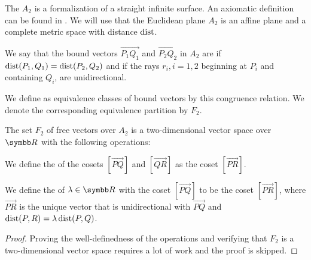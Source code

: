 \begin{definition}\label{def:euclidean_plane}
  The  \( A_2 \) is a formalization of a straight infinite surface. An axiomatic definition can be found in \cite{nLab:euclidean_geometry}. We will use that the Euclidean plane \( A_2 \) is an affine plane and a complete metric space with distance \( \operatorname{dist} \).
\end{definition}

\begin{definition}\label{def:euclidean_plane_free_vector}
  We say that the bound vectors \( \Vec{P_1 Q_1} \) and \( \Vec{P_2 Q_2} \) in \( A_2 \) are  if \( \operatorname{dist}(P_1, Q_1) = \operatorname{dist}(P_2, Q_2) \) and if the rays \( r_i, i = 1, 2 \) beginning at \( P_i \) and containing \( Q_i \), are unidirectional.

  We define  as equivalence classes of bound vectors by this congruence relation. We denote the corresponding equivalence partition by \( F_2 \).
\end{definition}

\begin{theorem}\label{thm:euclidean_plane_factorization}
  The set \( F_2 \) of free vectors over \( A_2 \) is a two-dimensional vector space over \( \R \) with the following operations:
  \begin{thmenum}
     We define the  of the cosets \( [\Vec{PQ}] \) and \( [\Vec{QR}] \) as the coset \( [\Vec{PR}] \).

     We define the  of \( \lambda \in \R \) with the coset \( [\Vec{PQ}] \) to be the coset \( [\Vec{PR}] \), where \( \Vec{PR} \) is the unique vector that is unidirectional with \( \Vec{PQ} \) and \( \operatorname{dist}(P, R) = \lambda \operatorname{dist}(P, Q) \).
  \end{thmenum}
\end{theorem}
\begin{proof}
  Proving the well-definedness of the operations and verifying that \( F_2 \) is a two-dimensional vector space requires a lot of work and the proof is skipped.
\end{proof}

